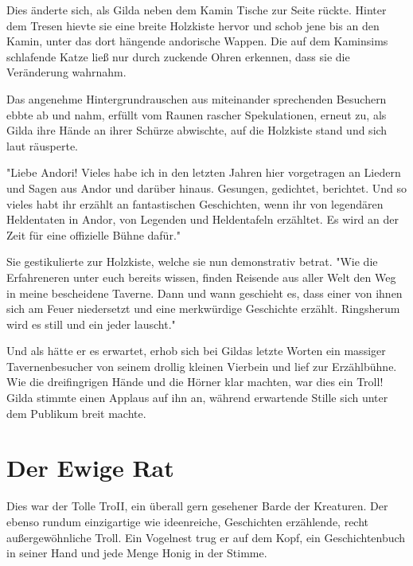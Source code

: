 Dies änderte sich, als Gilda neben dem Kamin Tische zur Seite rückte. Hinter dem Tresen hievte sie eine breite Holzkiste hervor und schob jene bis an den Kamin, unter das dort hängende andorische Wappen. Die auf dem Kaminsims schlafende Katze ließ nur durch zuckende Ohren erkennen, dass sie die Veränderung wahrnahm.

Das angenehme Hintergrundrauschen aus miteinander sprechenden Besuchern ebbte ab und nahm, erfüllt vom Raunen rascher Spekulationen, erneut zu, als Gilda ihre Hände an ihrer Schürze abwischte, auf die Holzkiste stand und sich laut räusperte.

"Liebe Andori! Vieles habe ich in den letzten Jahren hier vorgetragen an Liedern und Sagen aus Andor und darüber hinaus. Gesungen, gedichtet, berichtet. Und so vieles habt ihr erzählt an fantastischen Geschichten, wenn ihr von legendären Heldentaten in Andor, von Legenden und Heldentafeln erzähltet. Es wird an der Zeit für eine offizielle Bühne dafür."

Sie gestikulierte zur Holzkiste, welche sie nun demonstrativ betrat. "Wie die Erfahreneren unter euch bereits wissen, finden Reisende aus aller Welt den Weg in meine bescheidene Taverne. Dann und wann geschieht es, dass einer von ihnen sich am Feuer niedersetzt und eine merkwürdige Geschichte erzählt. Ringsherum wird es still und ein jeder lauscht."

Und als hätte er es erwartet, erhob sich bei Gildas letzte Worten ein massiger Tavernenbesucher von seinem drollig kleinen Vierbein und lief zur Erzählbühne. Wie die dreifingrigen Hände und die Hörner klar machten, war dies ein Troll! Gilda stimmte einen Applaus auf ihn an, während erwartende Stille sich unter dem Publikum breit machte.



\newpage
\section{Der Ewige Rat}

Dies war der Tolle TroII, ein überall gern gesehener Barde der Kreaturen. Der ebenso rundum einzigartige wie ideenreiche, Geschichten erzählende, recht außergewöhnliche Troll. Ein Vogelnest trug er auf dem Kopf, ein Geschichtenbuch in seiner Hand und jede Menge Honig in der Stimme.

